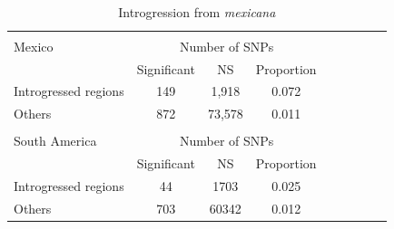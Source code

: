 {{\begin{table}[tb]
\begin{center}
 \caption[]{Introgression from \emph{mexicana}\hspace*{0.3cm}}
  \textbf{}\\[-2mm]
{\fontsize{7}{11}\sf
    \begin{tabular}{lcccccccl} 
    \hline
       & & \\[-3mm]
Mexico     & \multicolumn{3}{c}{Number of SNPs}  \\
                                  & Significant & NS & Proportion  \\
Introgressed regions & 149   &   1,918     & 0.072\\ 
Others                        & 872   &  73,578    & 0.011\\
      \hline
    & & \\[-3mm]
South America     & \multicolumn{3}{c}{Number of SNPs} \\
                                  & Significant & NS & Proportion  \\
Introgressed regions & 44   &   1703     & 0.025\\ 
Others      &703   &  60342    & 0.012\\[1mm]
    \hline
    \end{tabular}
    \label{mex}  %
}
\end{center}
\end{table}
\renewcommand{\arraystretch}{1}


\renewcommand{\arraystretch}{1.1}
\begin{table}[tb]


\end{table}}}
